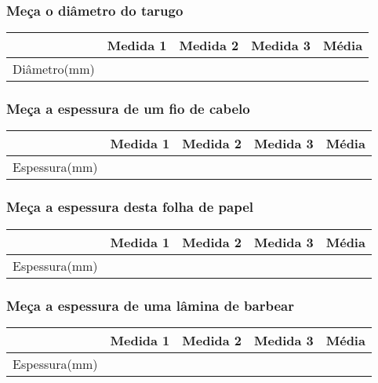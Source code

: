 \documentclass[10pt,a4paper,onecolumn,notitlepage]{scrartcl}
\begin{document}
\subsubsection{Meça o diâmetro do tarugo} 
\begin{table}[H]
\centering
\begin{tabular}{|l|*{4}{c|}}
\hline & Medida 1& Medida 2& Medida 3& Média \\
\hline Diâmetro(mm)& & &  & \\ 
\hline
\end{tabular}
\end{table}

\subsubsection{Meça a espessura de um fio de cabelo} 
\begin{table}[H]
\centering
\begin{tabular}{|l|*{4}{c|}}
\hline & Medida 1& Medida 2& Medida 3& Média \\
\hline Espessura(mm)& & &  & \\ 
\hline
\end{tabular}
\end{table}

\subsubsection{Meça a espessura desta folha de papel} 
\begin{table}[H]
\centering
\begin{tabular}{|l|*{4}{c|}}
\hline & Medida 1& Medida 2& Medida 3& Média \\
\hline Espessura(mm)& & &  & \\ 
\hline
\end{tabular}
\end{table}

\subsubsection{Meça a espessura de uma lâmina de barbear} 
\begin{table}[H]
\centering
\begin{tabular}{|l|*{4}{c|}}
\hline & Medida 1& Medida 2& Medida 3& Média \\
\hline Espessura(mm)& & &  & \\ 
\hline
\end{tabular}
\end{table}
\end{document}
